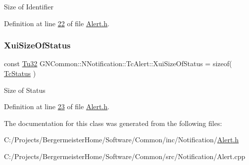 Size of Identifier 

Definition at line \mbox{\hyperlink{_alert_8h_source_l00022}{22}} of file \mbox{\hyperlink{_alert_8h_source}{Alert.\+h}}.

\mbox{\label{class_g_n_common_1_1_n_notification_1_1_tc_alert_a59f856e0a33731ee0c235271bb013a34}} 
\subsubsection{\texorpdfstring{Xui\+Size\+Of\+Status}{XuiSizeOfStatus}}
{\footnotesize\ttfamily const \mbox{\hyperlink{namespace_g_n_common_a941b527ef318f318aed7903dc832b7e4}{Tu32}} G\+N\+Common\+::\+N\+Notification\+::\+Tc\+Alert\+::\+Xui\+Size\+Of\+Status = sizeof( \mbox{\hyperlink{class_g_n_common_1_1_n_notification_1_1_tc_status}{Tc\+Status}} )\hspace{0.3cm}{\ttfamily [static]}}

Size of Status 

Definition at line \mbox{\hyperlink{_alert_8h_source_l00023}{23}} of file \mbox{\hyperlink{_alert_8h_source}{Alert.\+h}}.



The documentation for this class was generated from the following files\+:\begin{DoxyCompactItemize}
\item 
C\+:/\+Projects/\+Bergermeister\+Home/\+Software/\+Common/inc/\+Notification/\mbox{\hyperlink{_alert_8h}{Alert.\+h}}\item 
C\+:/\+Projects/\+Bergermeister\+Home/\+Software/\+Common/src/\+Notification/Alert.\+cpp\end{DoxyCompactItemize}
